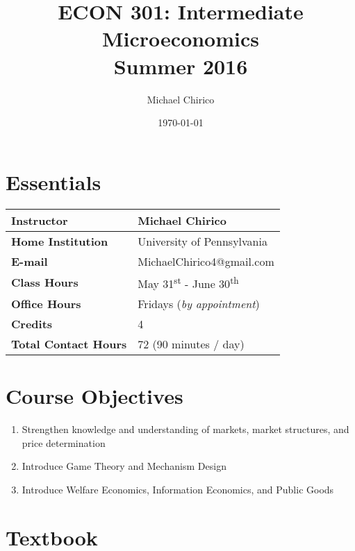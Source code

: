 \documentclass{article}
\begin{document}
\title{ECON 301: Intermediate Microeconomics \\ Summer 2016}

\author{Michael Chirico}

\date{\today}

\maketitle

\section*{Essentials}

\begin{table}[h]
\centering
\begin{tabular}{|l|l|}
\hline
\textbf{Instructor} & Michael Chirico \\
\hline
\textbf{Home Institution} & University of Pennsylvania \\
\hline
\textbf{E-mail} & MichaelChirico4@gmail.com \\
\hline
\textbf{Class Hours} & May 31\textsuperscript{st} - June 30\textsuperscript{th} \\
\hline
\textbf{Office Hours} & Fridays (\textit{by appointment}) \\
\hline
\textbf{Credits} & 4 \\
\hline
\textbf{Total Contact Hours} & 72 (90 minutes / day) \\
\hline
\end{tabular}
\end{table}

\section*{Course Objectives}

\begin{enumerate}
\item Strengthen knowledge and understanding of markets, market structures, and price determination
\item Introduce Game Theory and Mechanism Design
\item Introduce Welfare Economics, Information Economics, and Public Goods
\end{enumerate}

\section*{Textbook}
\end{document}
